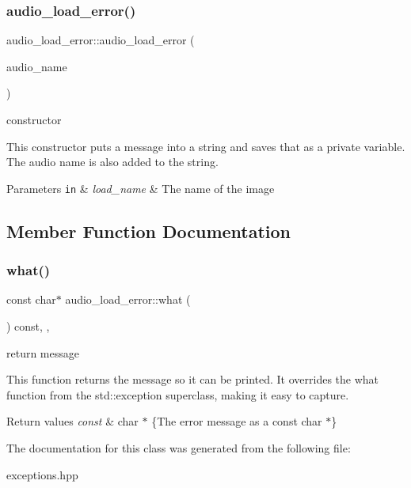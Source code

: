 \subsubsection{\texorpdfstring{audio\+\_\+load\+\_\+error()}{audio\_load\_error()}}
{\footnotesize\ttfamily audio\+\_\+load\+\_\+error\+::audio\+\_\+load\+\_\+error (\begin{DoxyParamCaption}\item[{const std\+::string \&}]{audio\+\_\+name }\end{DoxyParamCaption})\hspace{0.3cm}{\ttfamily [inline]}}



constructor 

This constructor puts a message into a string and saves that as a private variable. The audio name is also added to the string.


\begin{DoxyParams}[1]{Parameters}
\mbox{\tt in}  & {\em load\+\_\+name} & The name of the image \\
\hline
\end{DoxyParams}


\subsection{Member Function Documentation}
\mbox{\label{classaudio__load__error_a364ad9c1cb7de37f0cb3e33dbebbaa47}} 
\subsubsection{\texorpdfstring{what()}{what()}}
{\footnotesize\ttfamily const char$\ast$ audio\+\_\+load\+\_\+error\+::what (\begin{DoxyParamCaption}{ }\end{DoxyParamCaption}) const\hspace{0.3cm}{\ttfamily [inline]}, {\ttfamily [override]}, {\ttfamily [noexcept]}}



return message 

This function returns the message so it can be printed. It overrides the what function from the std\+::exception superclass, making it easy to capture.


\begin{DoxyRetVals}{Return values}
{\em const} & char $\ast$ \{The error message as a const char $\ast$\} \\
\hline
\end{DoxyRetVals}


The documentation for this class was generated from the following file\+:\begin{DoxyCompactItemize}
\item 
exceptions.\+hpp\end{DoxyCompactItemize}
